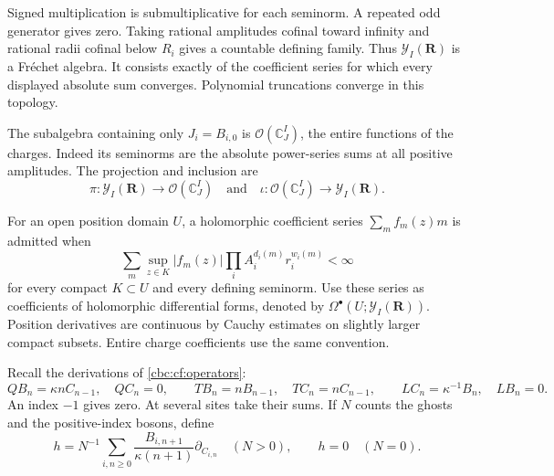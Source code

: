 Signed multiplication is submultiplicative for each seminorm.
A repeated odd generator gives zero. Taking rational amplitudes
cofinal toward infinity and rational radii cofinal below $R_i$
gives a countable defining family. Thus $\mathcal Y_I(\mathbf R)$
is a Fr\'echet algebra. It consists exactly of the coefficient
series for which every displayed absolute sum converges.
Polynomial truncations converge in this topology.

The subalgebra containing only $J_i=B_{i,0}$ is
$\mathcal O(\mathbb C^I_J)$, the entire functions of the
charges. Indeed its seminorms are the absolute power-series
sums at all positive amplitudes. The projection and inclusion are
\[
 \pi:\mathcal Y_I(\mathbf R)\longrightarrow
                           \mathcal O(\mathbb C^I_J)
 \quad\text{and}\quad
 \iota:\mathcal O(\mathbb C^I_J)\longrightarrow
                           \mathcal Y_I(\mathbf R).
\]

For an open position domain $U$, a holomorphic coefficient
series $\sum_m f_m(z)m$ is admitted when
\[
 \sum_m\sup_{z\in K}|f_m(z)|
             \prod_i A_i^{d_i(m)}r_i^{w_i(m)}<\infty
\]
for every compact $K\subset U$ and every defining seminorm.
Use these series as coefficients of holomorphic differential
forms, denoted by $\Omega^\bullet(U;\mathcal Y_I(\mathbf R))$.
Position derivatives are continuous by Cauchy estimates on
slightly larger compact subsets. Entire charge coefficients
use the same convention.

Recall the derivations of \eqref{cbc:cf:operators}:
\[
 QB_n=\kappa nC_{n-1},\quad QC_n=0,\qquad
 TB_n=nB_{n-1},\quad TC_n=nC_{n-1},\qquad
 LC_n=\kappa^{-1}B_n,\quad LB_n=0.
\]
An index $-1$ gives zero. At several sites take their sums.
If $N$ counts the ghosts and the positive-index bosons,
define
\begin{equation}\label{cbc:ac:h}
 h=N^{-1}\sum_{i,n\geq0}
        \frac{B_{i,n+1}}{\kappa(n+1)}\partial_{C_{i,n}}
       \quad(N>0),\qquad h=0\quad(N=0).
\end{equation}

